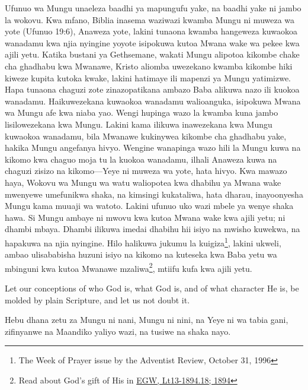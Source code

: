 Ufunuo wa Mungu unaeleza baadhi ya mapungufu yake, na baadhi yake ni jambo la wokovu. Kwa mfano, Biblia inasema waziwazi kwamba Mungu ni muweza wa yote (Ufunuo 19:6), Anaweza yote, lakini tunaona kwamba hangeweza kuwaokoa wanadamu kwa njia nyingine yoyote isipokuwa kutoa Mwana wake wa pekee kwa ajili yetu. Katika bustani ya Gethsemane, wakati Mungu alipotoa kikombe chake cha ghadhabu kwa Mwanawe, Kristo aliomba uwezekano kwamba kikombe hiki kiweze kupita kutoka kwake, lakini hatimaye ili mapenzi ya Mungu yatimizwe. Hapa tunaona chaguzi zote zinazopatikana ambazo Baba alikuwa nazo ili kuokoa wanadamu. Haikuwezekana kuwaokoa wanadamu walioanguka, isipokuwa Mwana wa Mungu afe kwa niaba yao. Wengi hupinga wazo la kwamba kuna jambo lisilowezekana kwa Mungu. Lakini kama ilikuwa inawezekana kwa Mungu kuwaokoa wanadamu, bila Mwanawe kukinywea kikombe cha ghadhabu yake, hakika Mungu angefanya hivyo. Wengine wanapinga wazo hili la Mungu kuwa na kikomo kwa chaguo moja tu la kuokoa wanadamu, ilhali Anaweza kuwa na chaguzi zisizo na kikomo—Yeye ni muweza wa yote, hata hivyo. Kwa mawazo haya, Wokovu wa Mungu wa watu waliopotea kwa dhabihu ya Mwana wake mwenyewe umefunikwa shaka, na kimsingi kukataliwa, hata dharau, inayoonyesha Mungu kama muuaji wa watoto. Lakini ufunuo uko wazi mbele ya wenye shaka hawa. Si Mungu ambaye ni mwovu kwa kutoa Mwana wake kwa ajili yetu; ni dhambi mbaya. Dhambi ilikuwa imedai dhabihu hii isiyo na mwisho kuwekwa, na hapakuwa na njia nyingine. Hilo halikuwa jukumu la kuigiza\footnote{The Week of Prayer issue by the Adventist Review, October 31, 1996}, lakini ukweli, ambao ulisababisha huzuni isiyo na kikomo na kuteseka kwa Baba yetu wa mbinguni kwa kutoa Mwanawe mzaliwa\footnote{Read about God's gift of His  in \href{https://egwwritings.org/?ref=en_Lt13-1894.18&para=5486.24}{{EGW, Lt13-1894.18; 1894}}}, mtiifu kufa kwa ajili yetu.


Let our conceptions of who God is, what God is, and of what character He is, be molded by plain Scripture, and let us not doubt it.


Hebu dhana zetu za Mungu ni nani, Mungu ni nini, na Yeye ni wa tabia gani, zifinyanwe na Maandiko yaliyo wazi, na tusiwe na shaka nayo.






